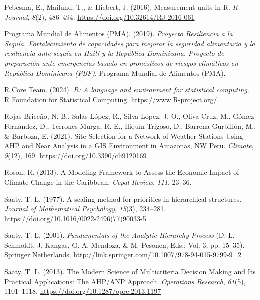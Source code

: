 \documentclass[spanish]{article}
\newlength{\cslhangindent}
\newlength{\cslentryspacingunit} %
\newenvironment{CSLReferences}[2] %
 {%
  \setlength{\parindent}{0pt}
  \ifodd #1
  \let\oldpar\par
  \def\par{\hangindent=\cslhangindent\oldpar}
  \fi
  \setlength{\parskip}{#2\cslentryspacingunit}
 }%
 {}
\begin{document}
\begin{CSLReferences}{1}{0}
\leavevmode{}%
Pebesma, E., Mailund, T., \& Hiebert, J. (2016). Measurement units in
{R}. \emph{R Journal}, \emph{8}(2), 486--494.
\url{https://doi.org/10.32614/RJ-2016-061}

\leavevmode{}%
Programa Mundial de Alimentos (PMA). (2019). \emph{{Proyecto Resiliencia
a la Sequía. Fortalecimiento de capacidades para mejorar la seguridad
alimentaria y la resiliencia ante sequía en Haití y la República
Dominicana. Proyecto de preparación ante emergencias basado en
pronósticos de riesgos climáticos en República Dominicana (FBF)}}.
{Programa Mundial de Alimentos (PMA)}.

\leavevmode{}%
R Core Team. (2024). \emph{R: A language and environment for statistical
computing}. R Foundation for Statistical Computing.
\url{https://www.R-project.org/}

\leavevmode{}%
Rojas Briceño, N. B., Salas López, R., Silva López, J. O., Oliva-Cruz,
M., Gómez Fernández, D., Terrones Murga, R. E., Iliquín Trigoso, D.,
Barrena Gurbillón, M., \& Barboza, E. (2021). Site Selection for a
Network of Weather Stations Using AHP and Near Analysis in a GIS
Environment in Amazonas, NW Peru. \emph{Climate}, \emph{9}(12), 169.
\url{https://doi.org/10.3390/cli9120169}

\leavevmode{}%
Roson, R. (2013). {A Modeling Framework to Assess the Economic Impact of
Climate Change in the Caribbean}. \emph{Cepal Review}, \emph{111},
23--36.

\leavevmode{}%
Saaty, T. L. (1977). A scaling method for priorities in hierarchical
structures. \emph{Journal of Mathematical Psychology}, \emph{15}(3),
234--281. \url{https://doi.org/10.1016/0022-2496(77)90033-5}

\leavevmode{}%
Saaty, T. L. (2001). \emph{Fundamentals of the Analytic Hierarchy
Process} (D. L. Schmoldt, J. Kangas, G. A. Mendoza, \& M. Pesonen, Eds.;
Vol. 3, pp. 15--35). Springer Netherlands.
\url{http://link.springer.com/10.1007/978-94-015-9799-9_2}

\leavevmode{}%
Saaty, T. L. (2013). The Modern Science of Multicriteria Decision Making
and Its Practical Applications: The AHP/ANP Approach. \emph{Operations
Research}, \emph{61}(5), 1101--1118.
\url{https://doi.org/10.1287/opre.2013.1197}


\end{CSLReferences}
\end{document}
